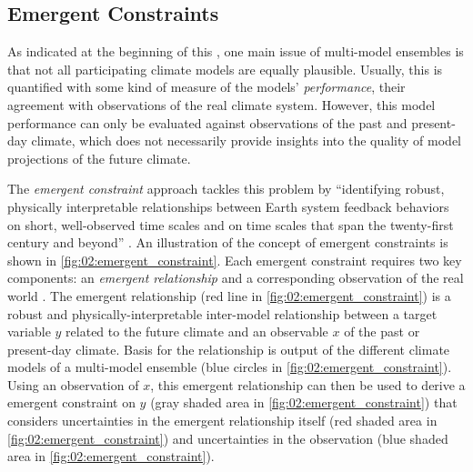 \subsection{Emergent Constraints}
\label{subsec:02:emergent_constraints}

As indicated at the beginning of this ,
one main issue of multi-model ensembles is that not all participating climate
models are equally plausible. Usually, this is quantified with some kind of
measure of the models' \emph{performance}, \ie{} their agreement with
observations of the real climate system. However, this model performance can
only be evaluated against observations of the past and present-day climate,
which does not necessarily provide insights into the quality of model
projections of the future climate.

The \emph{emergent constraint} approach tackles this problem by
\enquote{identifying robust, physically interpretable relationships between
  Earth system feedback behaviors on short, well-observed time scales and on
  time scales that span the twenty-first century and beyond}
\autocite{Eyring2019}. An illustration of the concept of emergent constraints
is shown in \cref{fig:02:emergent_constraint}. Each emergent constraint
requires two key components: an \emph{emergent relationship} and a
corresponding observation of the real world \autocite{Eyring2019}. The emergent
relationship (red line in \cref{fig:02:emergent_constraint}) is a robust and
physically-interpretable inter-model relationship between a target variable $y$
related to the future climate and an observable $x$ of the past or present-day
climate. Basis for the relationship is output of the different climate models
of a multi-model ensemble (blue circles in \cref{fig:02:emergent_constraint}).
Using an observation of $x$, this emergent relationship can then be used to
derive a emergent constraint on $y$ (gray shaded area in
\cref{fig:02:emergent_constraint}) that considers uncertainties in the emergent
relationship itself (red shaded area in \cref{fig:02:emergent_constraint}) and
uncertainties in the observation (blue shaded area in
\cref{fig:02:emergent_constraint}).

